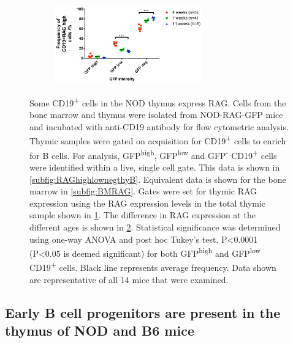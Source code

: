 \begin{figure}
\begin{subfigure}{0.5\textwidth}
	\label{subfig:totalthyRAG}
	\end{subfigure}
	\begin{subfigure}{\textwidth}
	\caption{}
	\includegraphics[width=0.7\textwidth]{Figures/RAGhighlowneg.pdf}
	\label{subfig:RAGhighlowneggraph}
	\end{subfigure}
\caption[Some CD19\textsuperscript{+} cells in the NOD thymus express RAG]{Some CD19\textsuperscript{+} cells in the NOD thymus express RAG. 
Cells from the bone marrow and thymus were isolated from NOD-RAG-GFP mice and incubated with anti-CD19 antibody for flow cytometric analysis.
Thymic samples were gated on acquisition for CD19\textsuperscript{+} cells to enrich for B cells.
For analysis, GFP\textsuperscript{high}, GFP\textsuperscript{low} and GFP\textsuperscript{-} CD19\textsuperscript{+} cells were identified within a live, single cell gate. 
This data is shown in \ref{subfig:RAGhighlownegthyB}.
Equivalent data is shown for the bone marrow in \ref{subfig:BMRAG}.
Gates were set for thymic RAG expression using the RAG expression levels in the total thymic sample shown in \ref{subfig:totalthyRAG}.
The difference in RAG expression at the different ages is shown in \ref{subfig:RAGhighlowneggraph}. Statistical significance was determined using one-way ANOVA and post hoc Tukey's test. P<0.0001 (P<0.05 is deemed significant) for both GFP\textsuperscript{high} and GFP\textsuperscript{low} CD19\textsuperscript{+} cells. Black line represents average frequency.
Data shown are representative of all 14 mice that were examined.}
\label{fig:GFP}
\end{figure}


\subsection{Early B cell progenitors are present in the thymus of NOD and B6 mice}
\label{subsec:earlyprogens}


